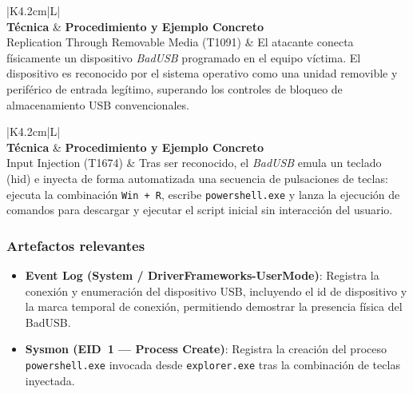 \begin{table}[htbp]
    \centering
    \caption{Táctica: Initial Access (TA0001) — Fase de Entrega}
    \label{tab:tactica-initial-access-entrega}
    \renewcommand{\arraystretch}{1.3}
    \small
    \begin{tabularx}{\textwidth}{|K{4.2cm}|L|}
        \hline
         \\ \hline
        \textbf{Técnica} & \textbf{Procedimiento y Ejemplo Concreto} \\ \hline
        Replication Through Removable Media (T1091) & El atacante conecta físicamente un dispositivo \textit{BadUSB} programado en el equipo víctima. El dispositivo es reconocido por el sistema operativo como una unidad removible y periférico de entrada legítimo, superando los controles de bloqueo de almacenamiento USB convencionales. \\ \hline
    \end{tabularx}
\end{table}

\begin{table}[htbp]
    \centering
    \caption{Táctica: Execution (TA0002) — Fase de Entrega}
    \label{tab:tactica-execution-entrega}
    \renewcommand{\arraystretch}{1.3}
    \small
    \begin{tabularx}{\textwidth}{|K{4.2cm}|L|}
        \hline
         \\ \hline
        \textbf{Técnica} & \textbf{Procedimiento y Ejemplo Concreto} \\ \hline
        Input Injection (T1674) & Tras ser reconocido, el \textit{BadUSB} emula un teclado (\acrshort{hid}) e inyecta de forma automatizada una secuencia de pulsaciones de teclas: ejecuta la combinación \texttt{Win + R}, escribe \texttt{powershell.exe} y lanza la ejecución de comandos para descargar y ejecutar el script inicial sin interacción del usuario. \\ \hline
    \end{tabularx}
\end{table}

\subsubsection{Artefactos relevantes}

\begin{itemize}
    \item \textbf{Event Log (System / DriverFrameworks-UserMode)}: Registra la conexión y enumeración del dispositivo USB, incluyendo el id de dispositivo y la marca temporal de conexión, permitiendo demostrar la presencia física del BadUSB.
    \item \textbf{Sysmon (EID~1 — Process Create)}: Registra la creación del proceso \texttt{powershell.exe} invocada desde \texttt{explorer.exe} tras la combinación de teclas inyectada.
\end{itemize}


